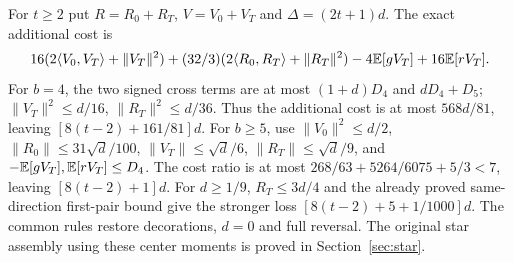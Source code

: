 For $t\ge2$ put $R=R_0+R_T$, $V=V_0+V_T$ and
$\Delta=(2t+1)d$. The exact additional cost is
\[
 16(2\langle V_0,V_T\rangle+\|V_T\|^2)
 +(32/3)(2\langle R_0,R_T\rangle+\|R_T\|^2)
 -4\mathbb E[gV_T]+16\mathbb E[rV_T].
\]
For $b=4$, the two signed cross terms are at most
$(1+d)D_4$ and $dD_4+D_5$;
$\|V_T\|^2\le d/16$, $\|R_T\|^2\le d/36$.
Thus the additional cost is at most $568d/81$, leaving
$[8(t-2)+161/81]d$.
For $b\ge5$, use
$\|V_0\|^2\le d/2$, $\|R_0\|\le31\sqrt d/100$,
$\|V_T\|\le\sqrt d/6$, $\|R_T\|\le\sqrt d/9$,
and $-\mathbb E[gV_T],\mathbb E[rV_T]\le D_4$.
The cost ratio is at most $268/63+5264/6075+5/3<7$,
leaving $[8(t-2)+1]d$.
For $d\ge1/9$, $R_T\le3d/4$ and the already proved same-direction
first-pair bound give the stronger loss $[8(t-2)+5+1/1000]d$.
The common rules restore decorations, $d=0$ and full reversal.
The original star assembly using these center moments is proved in
Section~\ref{sec:star}.
